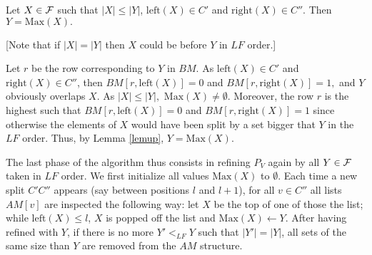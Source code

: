 \documentclass{llncs}
\begin{document}
\begin{lemma} 
Let $X \in {\cal F}$ such that $|X| \leq |Y|$,  $\mbox{left}(X) \in C'$
and $\mbox{right}(X)\in C''.$ Then $Y=\mbox{Max}(X).$
\label{assignmax}
\end{lemma}
[Note that if $|X| = |Y|$ then $X$ could be before $Y$ in $LF$ order.]\\
\begin{preuve}
Let $r$ be the row corresponding to $Y$ in $BM$. As $\mbox{left}(X)\in
C'$ and $\mbox{right}(X) \in C''$, then $BM[r,\mbox{left}(X)]=0$ and
$BM[r,\mbox{right}(X)]=1,$ and $Y$ obviously overlaps $X.$ As $|X|
\leq |Y|,$ $\mbox{Max}(X)\not=\emptyset.$ Moreover, the row $r$ is the
highest such that $BM[r,\mbox{left}(X)]=0$ and
$BM[r,\mbox{right}(X)]=1$ since otherwise the elements of $X$ would
have been split by a set bigger that $Y$ in the $LF$ order. Thus, by
Lemma \ref{lemup}, $Y=\mbox{Max}(X).$
\end{preuve}

\noindent
The last phase of the algorithm thus consists in refining $P_V$ again by
all $Y \in {\cal F}$ taken in $LF$ order. We first initialize all
values $\mbox{Max}(X)$ to $\emptyset$. Each time a new split $C'C''$
appears (say between positions $l$ and $l+1$), for all $v \in C''$ all
lists $AM[v]$ are inspected the following way: let $X$ be the top of
one of those the list; while $\mbox{left}(X)\leq l$, $X$ is popped off
the list and $\mbox{Max}(X) \leftarrow Y$. After having refined with
$Y$, if there is no more $Y' <_{LF} Y$ such that $|Y'|=|Y|$, all sets
of the same size than $Y$ are removed from the $AM$ structure.\\
\end{document}

